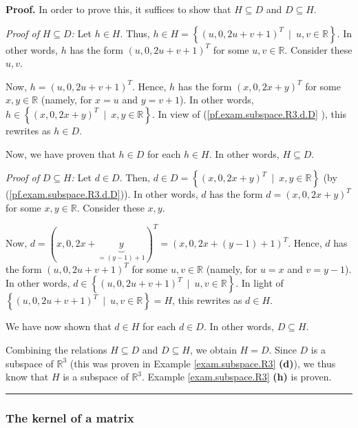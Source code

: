 \documentclass[numbers=enddot,12pt,final,onecolumn,notitlepage]{scrartcl}%
\theoremstyle{definition}
\newenvironment{proof}[1][Proof]{\noindent\textbf{#1.} }{\ \rule{0.5em}{0.5em}}
\begin{document}
\begin{proof}
In order to prove this, it suffices to show that $H\subseteq D$ and
$D\subseteq H$.

\textit{Proof of }$H\subseteq D$\textit{:} Let $h\in H$. Thus, $h\in
H=\left\{  \left(  u,0,2u+v+1\right)  ^{T}\ \mid\ u,v\in\mathbb{R}\right\}  $.
In other words, $h$ has the form $\left(  u,0,2u+v+1\right)  ^{T}$ for some
$u,v\in\mathbb{R}$. Consider these $u,v$.

Now, $h=\left(  u,0,2u+v+1\right)  ^{T}$. Hence, $h$ has the form $\left(
x,0,2x+y\right)  ^{T}$ for some $x,y\in\mathbb{R}$ (namely, for $x=u$ and
$y=v+1$). In other words, $h\in\left\{  \left(  x,0,2x+y\right)  ^{T}%
\ \mid\ x,y\in\mathbb{R}\right\}  $. In view of (\ref{pf.exam.subspace.R3.d.D}%
), this rewrites as $h\in D$.

Now, we have proven that $h\in D$ for each $h\in H$. In other words,
$H\subseteq D$.

\textit{Proof of }$D\subseteq H$\textit{:} Let $d\in D$. Then, $d\in
D=\left\{  \left(  x,0,2x+y\right)  ^{T}\ \mid\ x,y\in\mathbb{R}\right\}  $
(by (\ref{pf.exam.subspace.R3.d.D})). In other words, $d$ has the form
$d=\left(  x,0,2x+y\right)  ^{T}$ for some $x,y\in\mathbb{R}$. Consider these
$x,y$.

Now, $d=\left(  x,0,2x+\underbrace{y}_{=\left(  y-1\right)  +1}\right)
^{T}=\left(  x,0,2x+\left(  y-1\right)  +1\right)  ^{T}$. Hence, $d$ has the
form $\left(  u,0,2u+v+1\right)  ^{T}$ for some $u,v\in\mathbb{R}$ (namely,
for $u=x$ and $v=y-1$). In other words, $d\in\left\{  \left(
u,0,2u+v+1\right)  ^{T}\ \mid\ u,v\in\mathbb{R}\right\}  $. In light of
$\left\{  \left(  u,0,2u+v+1\right)  ^{T}\ \mid\ u,v\in\mathbb{R}\right\}
=H$, this rewrites as $d\in H$.

We have now shown that $d\in H$ for each $d\in D$. In other words, $D\subseteq
H$.

Combining the relations $H\subseteq D$ and $D\subseteq H$, we obtain $H=D$.
Since $D$ is a subspace of $\mathbb{R}^{3}$ (this was proven in Example
\ref{exam.subspace.R3} \textbf{(d)}), we thus know that $H$ is a subspace of
$\mathbb{R}^{3}$. Example \ref{exam.subspace.R3} \textbf{(h)} is proven.
\end{proof}

\subsubsection{The kernel of a matrix}
\end{document}

